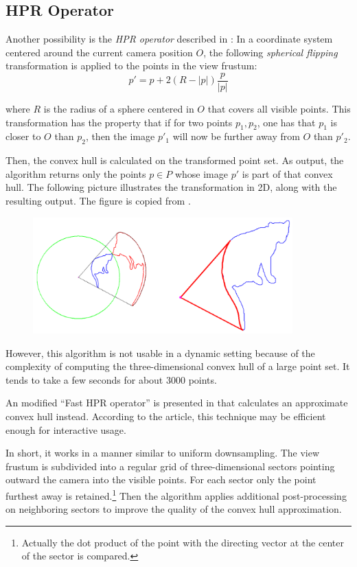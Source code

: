\documentclass[a4paper,10pt,abstracton,notitlepage]{scrreprt}
\begin{document}
\subsection{HPR Operator}
Another possibility is the \emph{HPR operator} described in \cite{Kat2007}: In a coordinate system centered around the current camera position $O$, the following \emph{spherical flipping} transformation is applied to the points in the view frustum:
\begin{equation}
	p' = p + 2(R - |p|) \frac{p}{|p|}
\end{equation}

where $R$ is the radius of a sphere centered in $O$ that covers all visible points. This transformation has the property that if for two points $p_{1}, p_{2}$, one has that $p_{1}$ is closer to $O$ than $p_{2}$, then the image $p'_{1}$ will now be further away from $O$ than $p'_{2}$.

Then, the convex hull is calculated on the transformed point set. As output, the algorithm returns only the points $p \in P$ whose image $p'$ is part of that convex hull. The following picture illustrates the transformation in 2D, along with the resulting output. The figure is copied from \cite{Kat2007}.

\begin{figure}[H]
\centering
	\includegraphics[width=10cm]{hpr.png}
\end{figure}

However, this algorithm is not usable in a dynamic setting because of the complexity of computing the three-dimensional convex hull of a large point set. It tends to take a few seconds for about $3000$ points.

An modified ``Fast HPR operator'' is presented in \cite{Ren2012} that calculates an approximate convex hull instead. According to the article, this technique may be efficient enough for interactive usage.

In short, it works in a manner similar to uniform downsampling. The view frustum is subdivided into a regular grid of three-dimensional sectors pointing outward the camera into the visible points. For each sector only the point furthest away is retained.\footnote{Actually the dot product of the point with the directing vector at the center of the sector is compared.} Then the algorithm applies additional post-processing on neighboring sectors to improve the quality of the convex hull approximation.
\end{document}
